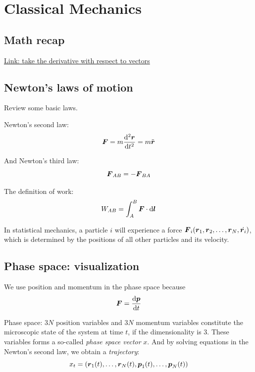 \chapter{Classical Mechanics}

\section{Math recap}

\href{https://www.cnblogs.com/yanghh/p/13756471.html}{Link: take the derivative with respect to vectors}

\section{Newton's laws of motion}

Review some basic laws.

Newton's second law:
\begin{equation}
	\boldsymbol{F}=m\dfrac{\mathrm{d}^2 \boldsymbol{r}}{\mathrm{d} t^2}=m\ddot{\boldsymbol{r}} \label{eq:newton2nd}
\end{equation}

And Newton's third law:
\begin{equation}
	\boldsymbol{F}_{AB}=-\boldsymbol{F}_{BA}
\end{equation}

The definition of work:
\begin{equation}
	W_{AB}=\int_A^B\boldsymbol{F}\cdot\mathrm{d}\boldsymbol{l}
\end{equation}

In statistical mechanics, a particle $i$ will experience a force $\boldsymbol{F}_i(\boldsymbol{r}_1, \boldsymbol{r}_2,\dots, \boldsymbol{r}_N, \dot{\boldsymbol{r}_i})$, which is determined by the positions of all other particles and its velocity. 

\section{Phase space: visualization}

We use position and momentum in the phase space because
\begin{equation}
	\boldsymbol{F}=\dfrac{\mathrm{d} \boldsymbol{p}}{\mathrm{d} t} \label{rp}
\end{equation}

Phase space: $3N$ position variables and $3N$ momentum variables constitute the microscopic state of the system at time $t$, if the dimensionality is 3. These variables forms a so-called \textit{phase space vector} $x$. And by solving equations in the Newton's second law, we obtain a \textit{trajectory}:
\begin{equation}
	x_t=\left(\boldsymbol{r}_1(t), \dots, \boldsymbol{r}_N(t), \boldsymbol{p}_1(t), \dots, \boldsymbol{p}_N(t)\right) \label{eq:phase-space-vector}
\end{equation}

